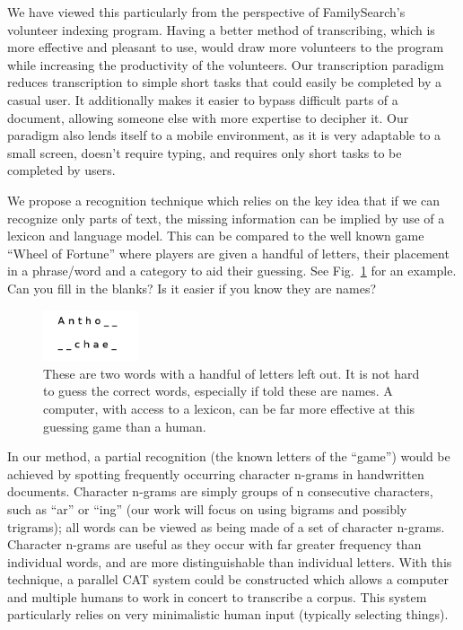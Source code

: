 \documentclass[ms]{byuprop}
\begin{document}
We have viewed this particularly from the perspective of FamilySearch's volunteer indexing program. Having a better method of transcribing, which is more effective and pleasant to use, would  draw more volunteers to the program while increasing the productivity of the volunteers. Our transcription paradigm reduces transcription to simple short tasks that could easily be completed by a casual user. It additionally makes it easier to bypass difficult parts of a document, allowing someone else with more expertise to decipher it. Our paradigm also lends itself to a mobile environment, as it is very adaptable to a small screen, doesn't require typing, and requires only short tasks to be completed by users.


We propose a recognition technique which relies on the key idea that if we can recognize only parts of text, the missing information can be implied by use of a lexicon and language model. This can be compared to the well known game ``Wheel of Fortune'' where players are given a handful of letters, their placement in a phrase/word and a category to aid their guessing. See Fig.~\ref{fig:wheel_of_fortune_example} for an example. Can you fill in the blanks? Is it easier if you know they are names?

\begin{figure}
    \centering
    \includegraphics[width=0.25\textwidth]{wheel_of_fortune_example}
    \caption{These are two words with a handful of letters left out. It is not hard to guess the correct words, especially if told these are names. A computer, with access to a lexicon, can be far more effective at this guessing game than a human.}
    \label{fig:wheel_of_fortune_example}
\end{figure}

In our method, a partial recognition (the known letters of the ``game'') would be achieved by spotting frequently occurring character n-grams in handwritten documents. Character n-grams are simply groups of n consecutive characters, such as ``ar'' or ``ing'' (our work will focus on using bigrams and possibly trigrams); all words can be viewed as being made of a set of character n-grams. Character n-grams are useful as they occur with far greater frequency than individual words, and are more distinguishable than individual letters. With this technique, a parallel CAT system could be constructed which allows a computer and multiple humans to work in concert to transcribe a corpus. This system particularly relies on very minimalistic human input (typically selecting things).
\end{document}

